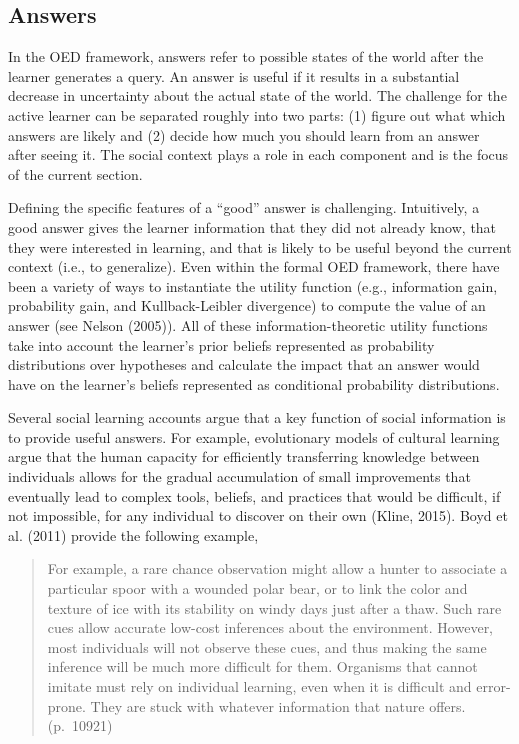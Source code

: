 \documentclass[english,floatsintext,man]{apa6}
\theoremstyle{definition}
\theoremstyle{definition}
\theoremstyle{definition}
\theoremstyle{remark}
\begin{document}
\subsection{Answers}\label{answers}

In the OED framework, answers refer to possible states of the world
after the learner generates a query. An answer is useful if it results
in a substantial decrease in uncertainty about the actual state of the
world. The challenge for the active learner can be separated roughly
into two parts: (1) figure out what which answers are likely and (2)
decide how much you should learn from an answer after seeing it. The
social context plays a role in each component and is the focus of the
current section.

Defining the specific features of a \enquote{good} answer is
challenging. Intuitively, a good answer gives the learner information
that they did not already know, that they were interested in learning,
and that is likely to be useful beyond the current context (i.e., to
generalize). Even within the formal OED framework, there have been a
variety of ways to instantiate the utility function (e.g., information
gain, probability gain, and Kullback-Leibler divergence) to compute the
value of an answer (see Nelson (2005)). All of these
information-theoretic utility functions take into account the learner's
prior beliefs represented as probability distributions over hypotheses
and calculate the impact that an answer would have on the learner's
beliefs represented as conditional probability distributions.

Several social learning accounts argue that a key function of social
information is to provide useful answers. For example, evolutionary
models of cultural learning argue that the human capacity for
efficiently transferring knowledge between individuals allows for the
gradual accumulation of small improvements that eventually lead to
complex tools, beliefs, and practices that would be difficult, if not
impossible, for any individual to discover on their own (Kline, 2015).
Boyd et al. (2011) provide the following example,

\begin{quote}
For example, a rare chance observation might allow a hunter to associate
a particular spoor with a wounded polar bear, or to link the color and
texture of ice with its stability on windy days just after a thaw. Such
rare cues allow accurate low-cost inferences about the environment.
However, most individuals will not observe these cues, and thus making
the same inference will be much more difficult for them. Organisms that
cannot imitate must rely on individual learning, even when it is
difficult and error-prone. They are stuck with whatever information that
nature offers. (p.~10921)
\end{quote}
\end{document}

